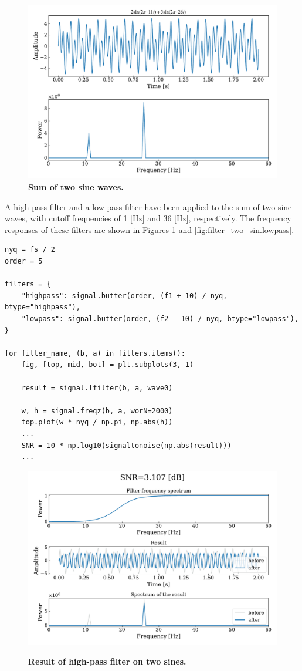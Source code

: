 \documentclass[13pt,a4paper]{article}
\begin{document}
\begin{figure}[ht!]
    \centering
    \caption{\textbf{Sum of two sine waves.}}
    \includegraphics[width=0.9\linewidth]{two_sin.pdf}
\end{figure}

A high-pass filter and a low-pass filter have been applied to the sum of two sine waves, with cutoff frequencies of 1 [Hz] and 36 [Hz], respectively. The frequency responses of these filters are shown in Figures \ref{fig:filter_two_sin.highpass} and \ref{fig:filter_two_sin.lowpass}.

\begin{lstlisting}[caption={\textbf{Code snippet for generating the two sine waves.}}]
nyq = fs / 2
order = 5

filters = {
    "highpass": signal.butter(order, (f1 + 10) / nyq, btype="highpass"),
    "lowpass": signal.butter(order, (f2 - 10) / nyq, btype="lowpass"),
}

for filter_name, (b, a) in filters.items():
    fig, [top, mid, bot] = plt.subplots(3, 1)

    result = signal.lfilter(b, a, wave0)

    w, h = signal.freqz(b, a, worN=2000)
    top.plot(w * nyq / np.pi, np.abs(h))
    ...
    SNR = 10 * np.log10(signaltonoise(np.abs(result)))
    ...
\end{lstlisting}

\begin{figure}[ht!]
    \centering
    \caption{\textbf{Result of high-pass filter on two sines.}}
    \includegraphics[width=0.9\linewidth]{filter_two_sin.highpass.pdf}
    \label{fig:filter_two_sin.highpass}
\end{figure}
\end{document}
